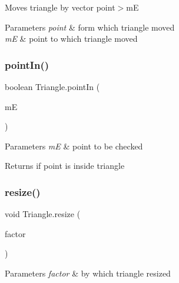 Moves triangle by vector point$>$mE 
\begin{DoxyParams}{Parameters}
{\em point} & form which triangle moved \\
\hline
{\em mE} & point to which triangle moved \\
\hline
\end{DoxyParams}
\mbox{\label{classTriangle_aefc686faa4251f80a2f8db82dc962fe5}} 
\subsubsection{\texorpdfstring{point\+In()}{pointIn()}}
{\footnotesize\ttfamily boolean Triangle.\+point\+In (\begin{DoxyParamCaption}\item[{Mouse\+Event}]{mE }\end{DoxyParamCaption})\hspace{0.3cm}{\ttfamily [inline]}}


\begin{DoxyParams}{Parameters}
{\em mE} & point to be checked \\
\hline
\end{DoxyParams}
\begin{DoxyReturn}{Returns}
if point is inside triangle 
\end{DoxyReturn}
\mbox{\label{classTriangle_a2c8b06fdba401b31c2eb92da12e08413}} 
\subsubsection{\texorpdfstring{resize()}{resize()}}
{\footnotesize\ttfamily void Triangle.\+resize (\begin{DoxyParamCaption}\item[{double}]{factor }\end{DoxyParamCaption})\hspace{0.3cm}{\ttfamily [inline]}}


\begin{DoxyParams}{Parameters}
{\em factor} & by which triangle resized \\
\hline
\end{DoxyParams}
\mbox{\label{classTriangle_a6eeb13ec68899a88f0ac1a3bc4f8eb3f}} 
